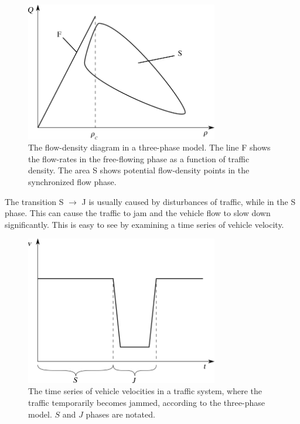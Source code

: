\documentclass[english, 12pt, a4paper, elec, utf8, pdfa, online]{aaltothesis}
\begin{document}
\begin{figure}[h]
    \centering
    \includegraphics[width=0.75\textwidth]{graphs/3phase_fs_diagram}
    \caption{The flow-density diagram in a three-phase model. The line F shows the flow-rates in the free-flowing phase as a function of traffic density. The area S shows potential flow-density points in the synchronized flow phase. }
\end{figure}

The transition S $\to$ J is usually caused by disturbances of traffic, while in the S phase. This can cause the traffic to jam and the vehicle flow to slow down significantly. This is easy to see by examining a time series of vehicle velocity. \cite{kerner}

\begin{figure}[h]
    \centering
    \includegraphics[width=0.75\textwidth]{graphs/3phase_vt}
    \caption{The time series of vehicle velocities in a traffic system, where the traffic temporarily becomes jammed, according to the three-phase model. $S$ and $J$ phases are notated. }
\end{figure}
\end{document}

